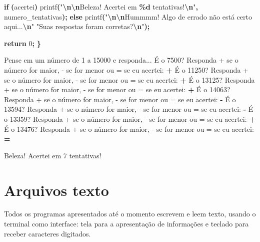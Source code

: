 \documentclass[
  11pt,
  a4paper,
]{scrbook}
\newenvironment{Shaded}{\begin{snugshade}}{\end{snugshade}}
\newcommand{\ControlFlowTok}[1]{\textcolor[rgb]{0.13,0.29,0.53}{\textbf{#1}}}
\newcommand{\DecValTok}[1]{\textcolor[rgb]{0.00,0.00,0.81}{#1}}
\newcommand{\KeywordTok}[1]{\textcolor[rgb]{0.13,0.29,0.53}{\textbf{#1}}}
\newcommand{\NormalTok}[1]{#1}
\newcommand{\OperatorTok}[1]{\textcolor[rgb]{0.81,0.36,0.00}{\textbf{#1}}}
\newcommand{\SpecialCharTok}[1]{\textcolor[rgb]{0.81,0.36,0.00}{\textbf{#1}}}
\newcommand{\StringTok}[1]{\textcolor[rgb]{0.31,0.60,0.02}{#1}}
\begin{document}
\begin{Shaded}
\begin{Highlighting}[]
    \ControlFlowTok{if} \OperatorTok{(}\NormalTok{acertei}\OperatorTok{)}
\NormalTok{        printf}\OperatorTok{(}\StringTok{"}\SpecialCharTok{\textbackslash{}n\textbackslash{}n}\StringTok{Beleza! Acertei em }\SpecialCharTok{\%d}\StringTok{ tentativas!}\SpecialCharTok{\textbackslash{}n}\StringTok{"}\OperatorTok{,}\NormalTok{ numero\_tentativas}\OperatorTok{);}
    \ControlFlowTok{else}
\NormalTok{        printf}\OperatorTok{(}\StringTok{"}\SpecialCharTok{\textbackslash{}n\textbackslash{}n}\StringTok{Hummmm! Algo de errado não está certo aqui...}\SpecialCharTok{\textbackslash{}n}\StringTok{"}
               \StringTok{"Suas respostas foram corretas?}\SpecialCharTok{\textbackslash{}n}\StringTok{"}\OperatorTok{);}

    \ControlFlowTok{return} \DecValTok{0}\OperatorTok{;}
\OperatorTok{\}}
\end{Highlighting}
\end{Shaded}

\begin{Shaded}
\begin{Highlighting}[]
\NormalTok{Pense em um número de 1 a 15000 e responda...}
\NormalTok{É o 7500?}
\NormalTok{Responda + se o número for maior, {-} se for menor ou = se eu acertei: }\KeywordTok{ + }
\NormalTok{É o 11250?}
\NormalTok{Responda + se o número for maior, {-} se for menor ou = se eu acertei: }\KeywordTok{ + }
\NormalTok{É o 13125?}
\NormalTok{Responda + se o número for maior, {-} se for menor ou = se eu acertei: }\KeywordTok{ + }
\NormalTok{É o 14063?}
\NormalTok{Responda + se o número for maior, {-} se for menor ou = se eu acertei: }\KeywordTok{ {-} }
\NormalTok{É o 13594?}
\NormalTok{Responda + se o número for maior, {-} se for menor ou = se eu acertei: }\KeywordTok{ {-} }
\NormalTok{É o 13359?}
\NormalTok{Responda + se o número for maior, {-} se for menor ou = se eu acertei: }\KeywordTok{ + }
\NormalTok{É o 13476?}
\NormalTok{Responda + se o número for maior, {-} se for menor ou = se eu acertei: }\KeywordTok{ = }


\NormalTok{Beleza! Acertei em 7 tentativas!}
\end{Highlighting}
\end{Shaded}

\chapter{Arquivos texto}\label{arquivos-texto}

Todos os programas apresentados até o momento escrevem e leem texto,
usando o terminal como interface: tela para a apresentação de
informações e teclado para receber caracteres digitados.
\end{document}

